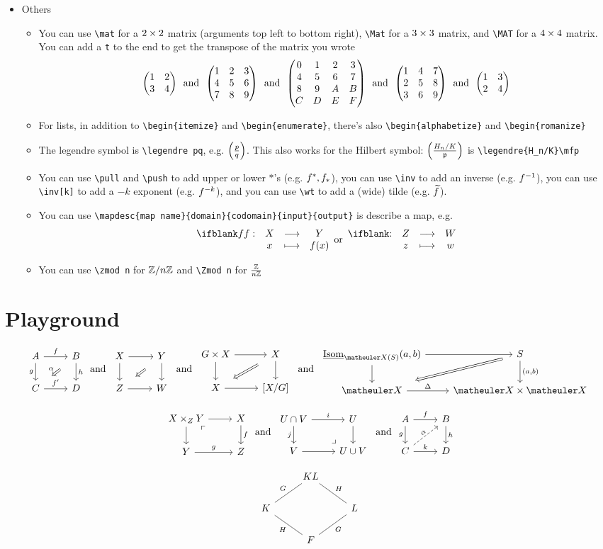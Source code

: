 \documentclass{article}
\numberwithin{thm}{section}
\numberwithin{prob}{section}
\numberwithin{equation}{section}
\begin{document}
\begin{itemize}
\begin{itemize}
    \end{itemize}
    \item Others
    \begin{itemize}
        \item You can use \verb+\mat+ for a $2\by2$ matrix (arguments top left to bottom right), \verb+\Mat+ for a $3\by3$ matrix, and \verb+\MAT+ for a $4\by4$ matrix. You can add a \verb+t+ to the end to get the transpose of the matrix you wrote
        $$\mat1234\tand\Mat123456789\tand\MAT0123456789ABCDEF\tand\Matt123456789\tand\matt1234$$
        \item For lists, in addition to \verb+\begin{itemize}+ and \verb+\begin{enumerate}+, there's also \verb+\begin{alphabetize}+ and \verb+\begin{romanize}+
        \item The legendre symbol is \verb+\legendre pq+, e.g. $\legendre pq$. This also works for the Hilbert symbol: $\legendre{H_n/K}\mfp$ is \verb+\legendre{H_n/K}\mfp+
        \item You can use \verb+\pull+ and \verb+\push+ to add upper or lower $*$'s (e.g. $\pull f,\push f$), you can use \verb+\inv+ to add an inverse (e.g. $\inv f$), you can use \verb+\inv[k]+ to add a $-k$ exponent (e.g. $\inv[k] f$), and you can use \verb+\wt+ to add a (wide) tilde (e.g. $\wt f$).
        \item You can use \verb+\mapdesc{map name}{domain}{codomain}{input}{output}+ is describe a map, e.g.
        $$\mapdesc fXYx{f(x)}\tor\mapdesc{}ZWzw$$
        \item You can use \verb+\zmod n+ for $\zmod n$ and \verb+\Zmod n+ for $\Zmod n$
    \end{itemize}
\end{itemize}

\newpage
\section{Playground}

$$\twocommsquare AfBghC{f'}D\alpha\tand\baretwocommsquare XYZW\tand\baretwocommsquare{G\by X}XX{[X/G]}\tand\twocommsquare{\ul\Isom_{\meX(S)}(a,b)}{}S{}{(a,b)}\meX\Delta{\meX\by\meX}{}$$

$$\pullback {X\by_ZY}XfYgZ\tand\pushout {U\cap V}iUjV{U\cup V}\tand\liftsquare AfBghCkD\alpha$$

$$\galoisdiamond{KL}GHKLHGF$$
\end{document}

